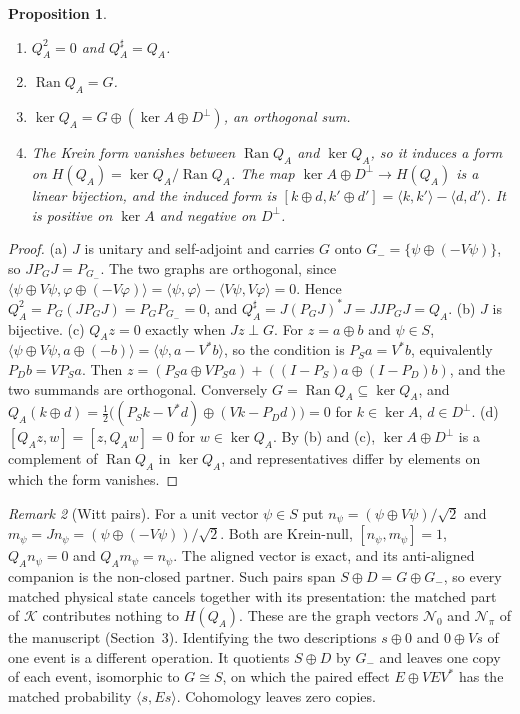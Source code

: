 \documentclass[11pt]{article}
\newtheorem{proposition}{Proposition}
\theoremstyle{remark}
\newtheorem{remark}[proposition]{Remark}
\newcommand{\K}{\mathcal K}
\newcommand{\Ran}{\operatorname{Ran}}
\newcommand{\kr}[2]{[#1,#2]}
\begin{document}
\begin{proposition}\label{prop:charge}
\begin{enumerate}
\item[(a)] $Q_A^2=0$ and $Q_A^\sharp=Q_A$.
\item[(b)] $\Ran Q_A=G$.
\item[(c)] $\ker Q_A=G\oplus(\ker A\oplus D^\perp)$, an orthogonal sum.
\item[(d)] The Krein form vanishes between $\Ran Q_A$ and $\ker Q_A$, so it induces a form on $H(Q_A)=\ker Q_A/\Ran Q_A$. The map $\ker A\oplus D^\perp\to H(Q_A)$ is a linear bijection, and the induced form is $\kr{k\oplus d}{k'\oplus d'}=\langle k,k'\rangle-\langle d,d'\rangle$. It is positive on $\ker A$ and negative on $D^\perp$.
\end{enumerate}
\end{proposition}

\begin{proof}
(a) $J$ is unitary and self-adjoint and carries $G$ onto $G_-=\{\psi\oplus(-V\psi)\}$, so $JP_GJ=P_{G_-}$. The two graphs are orthogonal, since $\langle\psi\oplus V\psi,\varphi\oplus(-V\varphi)\rangle=\langle\psi,\varphi\rangle-\langle V\psi,V\varphi\rangle=0$. Hence $Q_A^2=P_G(JP_GJ)=P_GP_{G_-}=0$, and $Q_A^\sharp=J(P_GJ)^*J=JJP_GJ=Q_A$. (b) $J$ is bijective. (c) $Q_Az=0$ exactly when $Jz\perp G$. For $z=a\oplus b$ and $\psi\in S$, $\langle\psi\oplus V\psi,a\oplus(-b)\rangle=\langle\psi,a-V^*b\rangle$, so the condition is $P_Sa=V^*b$, equivalently $P_Db=VP_Sa$. Then $z=(P_Sa\oplus VP_Sa)+((I-P_S)a\oplus(I-P_D)b)$, and the two summands are orthogonal. Conversely $G=\Ran Q_A\subseteq\ker Q_A$, and $Q_A(k\oplus d)=\tfrac12\bigl((P_Sk-V^*d)\oplus(Vk-P_Dd)\bigr)=0$ for $k\in\ker A$, $d\in D^\perp$. (d) $\kr{Q_Az}w=\kr z{Q_Aw}=0$ for $w\in\ker Q_A$. By (b) and (c), $\ker A\oplus D^\perp$ is a complement of $\Ran Q_A$ in $\ker Q_A$, and representatives differ by elements on which the form vanishes.
\end{proof}

\begin{remark}[Witt pairs]
For a unit vector $\psi\in S$ put $n_\psi=(\psi\oplus V\psi)/\sqrt2$ and $m_\psi=Jn_\psi=(\psi\oplus(-V\psi))/\sqrt2$. Both are Krein-null, $\kr{n_\psi}{m_\psi}=1$, $Q_An_\psi=0$ and $Q_Am_\psi=n_\psi$. The aligned vector is exact, and its anti-aligned companion is the non-closed partner. Such pairs span $S\oplus D=G\oplus G_-$, so every matched physical state cancels together with its presentation: the matched part of $\K$ contributes nothing to $H(Q_A)$. These are the graph vectors $\mathcal N_0$ and $\mathcal N_\pi$ of the manuscript (Section~3). Identifying the two descriptions $s\oplus0$ and $0\oplus Vs$ of one event is a different operation. It quotients $S\oplus D$ by $G_-$ and leaves one copy of each event, isomorphic to $G\cong S$, on which the paired effect $E\oplus VEV^*$ has the matched probability $\langle s,Es\rangle$. Cohomology leaves zero copies.
\end{remark}
\end{document}
